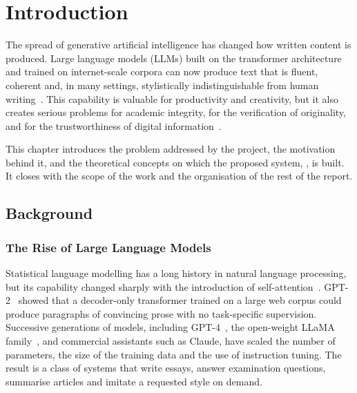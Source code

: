 \chapter{Introduction}
\label{ch:intro}

The spread of generative artificial intelligence has changed how written
content is produced. Large language models (LLMs) built on the transformer
architecture~\cite{vaswani2017attention} and trained on internet-scale corpora
can now produce text that is fluent, coherent and, in many settings,
stylistically indistinguishable from human writing~\cite{radford2019language,
openai2023gpt4,touvron2023llama}. This capability is valuable for productivity
and creativity, but it also creates serious problems for academic integrity,
for the verification of originality, and for the trustworthiness of digital
information~\cite{tang2024science,wu2025survey}.

This chapter introduces the problem addressed by the project, the motivation
behind it, and the theoretical concepts on which the proposed system,
\textbf{\veriscript}, is built. It closes with the scope of the work and the
organisation of the rest of the report.

\section{Background}

\subsection{The Rise of Large Language Models}

Statistical language modelling has a long history in natural language
processing, but its capability changed sharply with the introduction of
self-attention~\cite{vaswani2017attention}. GPT-2~\cite{radford2019language}
showed that a decoder-only transformer trained on a large web corpus could
produce paragraphs of convincing prose with no task-specific supervision.
Successive generations of models, including GPT-4~\cite{openai2023gpt4}, the
open-weight LLaMA family~\cite{touvron2023llama}, and commercial assistants
such as Claude, have scaled the number of parameters, the size of the training
data and the use of instruction tuning. The result is a class of systems that
write essays, answer examination questions, summarise articles and imitate a
requested style on demand.


